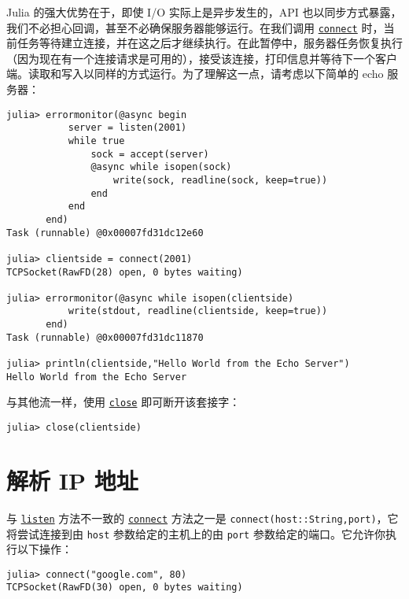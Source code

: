 Julia 的强大优势在于，即使 I/O 实际上是异步发生的，API 也以同步方式暴露，我们不必担心回调，甚至不必确保服务器能够运行。在我们调用 \hyperlink{5152827542417649360}{\texttt{connect}} 时，当前任务等待建立连接，并在这之后才继续执行。在此暂停中，服务器任务恢复执行（因为现在有一个连接请求是可用的），接受该连接，打印信息并等待下一个客户端。读取和写入以同样的方式运行。为了理解这一点，请考虑以下简单的 echo 服务器：




\begin{verbatim}
julia> errormonitor(@async begin
           server = listen(2001)
           while true
               sock = accept(server)
               @async while isopen(sock)
                   write(sock, readline(sock, keep=true))
               end
           end
       end)
Task (runnable) @0x00007fd31dc12e60

julia> clientside = connect(2001)
TCPSocket(RawFD(28) open, 0 bytes waiting)

julia> errormonitor(@async while isopen(clientside)
           write(stdout, readline(clientside, keep=true))
       end)
Task (runnable) @0x00007fd31dc11870

julia> println(clientside,"Hello World from the Echo Server")
Hello World from the Echo Server
\end{verbatim}



与其他流一样，使用 \hyperlink{5331333469799487255}{\texttt{close}} 即可断开该套接字：




\begin{verbatim}
julia> close(clientside)
\end{verbatim}



\hypertarget{8798664283149579111}{}


\section{解析 IP 地址}



与 \hyperlink{780704944207038170}{\texttt{listen}} 方法不一致的 \hyperlink{5152827542417649360}{\texttt{connect}} 方法之一是 \texttt{connect(host::String,port)}，它将尝试连接到由 \texttt{host} 参数给定的主机上的由 \texttt{port} 参数给定的端口。它允许你执行以下操作：




\begin{verbatim}
julia> connect("google.com", 80)
TCPSocket(RawFD(30) open, 0 bytes waiting)
\end{verbatim}



